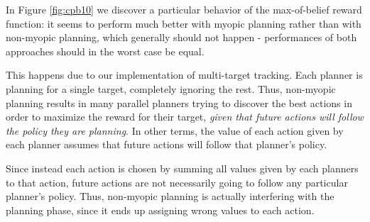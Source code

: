 In Figure \ref{fig:cpb10} we discover a particular behavior of the max-of-belief reward function:
it seems to perform much better with myopic planning rather than with non-myopic planning, which
generally should not happen - performances of both approaches should in the worst case be equal.

This happens due to our implementation of multi-target tracking. Each planner is planning for a
single target, completely ignoring the rest. Thus, non-myopic planning results in many parallel
planners trying to discover the best actions in order to maximize the reward for their target,
\textit{given that future actions will follow the policy they are planning}. In other terms, the
value of each action given by each planner assumes that future actions will follow that planner's
policy.

Since instead each action is chosen by summing all values given by each planners to that action,
future actions are not necessarily going to follow any particular planner's policy. Thus, non-myopic
planning is actually interfering with the planning phase, since it ends up assigning wrong values to
each action.

